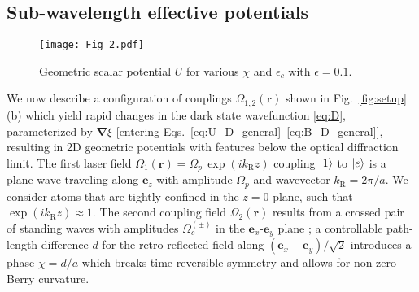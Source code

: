 \documentclass[aps,pra,twocolumn,showpacs,superscriptaddress,floatfix,longbibliography]{revtex4-1}
\def\kr{k_{\mathrm R}}                            			%
\def\Udd{U}
\def\ex{\boldsymbol{e}_x}
\def\ey{\boldsymbol{e}_y}
\def\ez{\boldsymbol{e}_z}
\begin{document}
\subsection{Sub-wavelength effective potentials}
\label{sec_effective_subwavelength}

\begin{figure*}[t]
\centering
  \texttt{[image: Fig\_2.pdf]}
  \caption{Geometric scalar potential $\Udd$ for various $\chi$ and $\epsilon_c$ with $\epsilon=0.1$.}
  \label{Fig_2}
\end{figure*}

We now describe a configuration of couplings $\Omega_{1,2}(\boldsymbol{r})$ shown in Fig.~\ref{fig:setup}(b) which yield rapid changes in the dark state wavefunction \eqref{eq:D}, parameterized by $\boldsymbol{\nabla}\xi$ [entering Eqs.~\eqref{eq:U_D_general}--\eqref{eq:B_D_general}], resulting in 2D geometric potentials with features below the optical diffraction limit.
The first laser field $\Omega_{1}(\boldsymbol{r}) = \Omega_p \, \exp(i \kr z)$ coupling $\ket{1}$ to $\ket{e}$ is a plane wave traveling along $\ez$ with amplitude $\Omega_{p}$ and wavevector $\kr=2\pi/a$.
We consider atoms that are tightly confined in the $z=0$ plane, such that $\exp(i \kr z) \approx 1$.
The second coupling field $\Omega_{2}(\boldsymbol{r})$ results from a crossed pair of standing waves with amplitudes $\Omega^{(\pm)}_{c}$ in the $\ex$-$\ey$ plane \cite{Hemmerich1991,Hemmerich1992,Juz-Spielm2012NJP}; a controllable path-length-difference $d$ for the retro-reflected field along $(\ex-\ey)/\sqrt{2}$ introduces a phase $\chi=d/a$ which breaks time-reversible symmetry and allows for non-zero Berry curvature.
\end{document}

